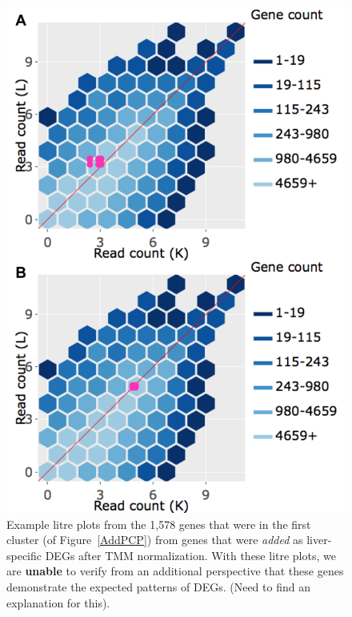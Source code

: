 \documentclass{article}
\begin{document}
\null
\begin{figure}[t!]
\centerline{\includegraphics[width=0.7\columnwidth]{../MakeFigures/Dashboards/litreClusterAdd/litreClusterAdd.jpg}}
\caption{Example litre plots from the 1,578 genes that were in the first cluster (of Figure~\ref{AddPCP}) from genes that were \textit{added} as liver-specific DEGs after TMM normalization. With these litre plots, we are \textbf{unable} to verify from an additional perspective that these genes demonstrate the expected patterns of DEGs. (Need to find an explanation for this).
\label{litreClusterAdd}}
\end{figure}
\end{document}
